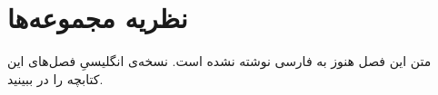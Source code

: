 \chapter{نظریه مجموعه‌ها}
\label{ch:02-set-theory-fa-01}

متن این فصل هنوز به فارسی نوشته نشده است. نسخه‌ی انگلیسیِ فصل‌های این کتابچه را در  ببینید.
